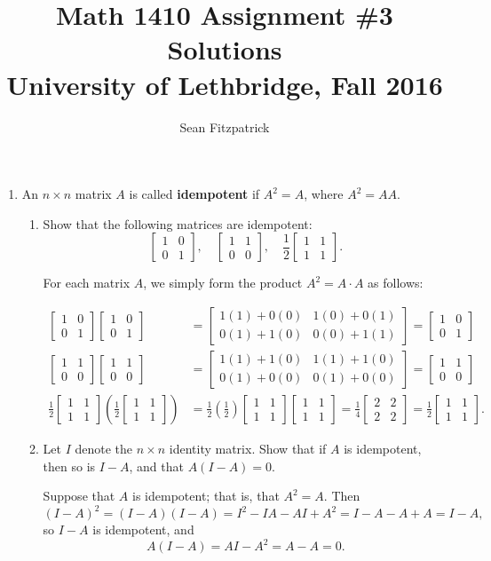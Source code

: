 \documentclass[letterpaper,12pt]{amsart}
\title{Math 1410 Assignment \#3 Solutions\\University of Lethbridge, Fall 2016}
\author{Sean Fitzpatrick}
\newcommand{\bbm}{\begin{bmatrix}}
\newcommand{\ebm}{\end{bmatrix}}
\begin{document}
 \maketitle


\begin{enumerate}
\item An $n\times n$ matrix $A$ is called \textbf{idempotent} if $A^2=A$, where $A^2 = AA$.

\medskip

\begin{enumerate}
 \item Show that the following matrices are idempotent:
\[
 \bbm 1&0\\0&1\ebm,\quad \bbm 1&1\\0&0\ebm,\quad \frac{1}{2}\bbm 1&1\\1&1\ebm.
\]

\bigskip

For each matrix $A$, we simply form the product $A^2=A\cdot A$ as follows:

\begin{align*}
 \bbm 1&0\\0&1\ebm\bbm 1&0\\0&1\ebm &= \bbm 1(1)+0(0)&1(0)+0(1)\\0(1)+1(0)&0(0)+1(1)\ebm =\bbm 1&0\\0&1\ebm\\
 \bbm 1&1\\0&0\ebm\bbm 1&1\\0&0\ebm &= \bbm 1(1)+1(0)&1(1)+1(0)\\0(1)+0(0)&0(1)+0(0)\ebm =\bbm 1&1\\0&0\ebm\\
 \frac{1}{2}\bbm 1&1\\1&1\ebm\left(\frac{1}{2}\bbm 1&1\\1&1\ebm\right)&=\frac{1}{2}\left(\frac{1}{2}\right)\bbm 1&1\\1&1\ebm \bbm 1&1\\1&1\ebm = \frac{1}{4}\bbm 2&2\\2&2\ebm = \frac{1}{2}\bbm 1&1\\1&1\ebm.
\end{align*}

\bigskip

 \item Let $I$ denote the $n\times n$ identity matrix. Show that if $A$ is idempotent, then so is $I-A$, and that $A(I-A)=0$.

\medskip

Suppose that $A$ is idempotent; that is, that $A^2=A$. Then
\[
 (I-A)^2 = (I-A)(I-A) = I^2-IA-AI+A^2 = I-A-A+A=I-A,
\]
so $I-A$ is idempotent, and
\[
 A(I-A) = AI-A^2 = A-A=0.
\]


\end{enumerate}
\end{enumerate}
\end{document}
